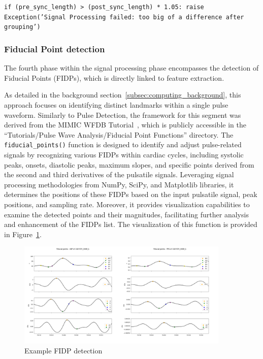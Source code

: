 \vspace{0.1cm}
{\texttt{\small if (pre\_sync\_length) > (post\_sync\_length) * 1.05: \newline
\indent\indent\indent raise Exception('Signal Processing failed: \newline
\indent\indent\indent\indent\indent\indent too big of a difference after grouping')}}
\vspace{0.1cm}

\subsubsection{Fiducial Point detection}
\label{subsubsec:fidp}

The fourth phase within the signal processing phase encompasses the detection of Fiducial Points (FIDPs), which is directly linked to feature extraction.

As detailed in the background section~\ref{subsec:computing_background}, this approach focuses on identifying distinct landmarks within a single pulse waveform.
Similarly to Pulse Detection, the framework for this segment was derived from the MIMIC WFDB Tutorial~\cite{charltonMIMICWFDBTutorials2022}, which is publicly accessible in the \enquote{Tutorials/Pulse Wave Analysis/Fiducial Point Functions} directory.
The \texttt{fiducial\_points()} function is designed to identify and adjust pulse-related signals by recognizing various FIDPs within cardiac cycles,
including systolic peaks, onsets, diastolic peaks, maximum slopes, and specific points derived from the second and third derivatives of the pulsatile signals.
Leveraging signal processing methodologies from NumPy, SciPy, and Matplotlib libraries, it determines the positions of these FIDPs based on the input pulsatile signal, peak positions, and sampling rate.
Moreover, it provides visualization capabilities to examine the detected points and their magnitudes, facilitating further analysis and enhancement of the FIDPs list.
The visualization of this function is provided in Figure~\ref{fig:wfdb_fidp}.

\begin{figure}[h]
    \includegraphics[width=0.9\textwidth]{images/methods/fidps}
    \caption{Example FIDP detection}
    \label{fig:wfdb_fidp}
\end{figure}

